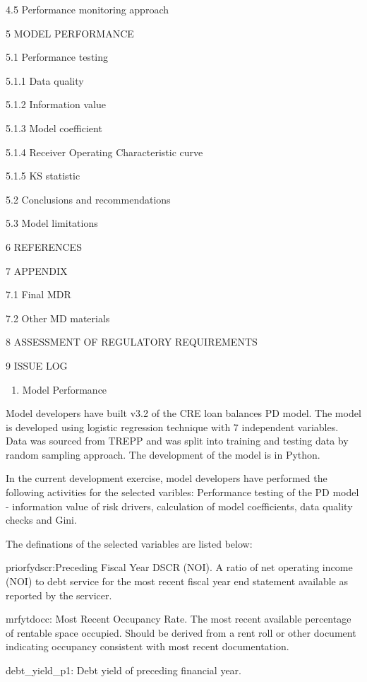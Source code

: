4.5 Performance monitoring approach

5 MODEL PERFORMANCE

5.1 Performance testing

5.1.1 Data quality

5.1.2 Information value

5.1.3 Model coefficient

5.1.4 Receiver Operating Characteristic curve

5.1.5 KS statistic

5.2 Conclusions and recommendations

5.3 Model limitations

6 REFERENCES

7 APPENDIX

7.1 Final MDR

7.2 Other MD materials

8 ASSESSMENT OF REGULATORY REQUIREMENTS

9 ISSUE LOG

\begin{enumerate}
\def\labelenumi{\arabic{enumi}.}
\setcounter{enumi}{4}
\tightlist
\item
  Model Performance
\end{enumerate}

Model developers have built v3.2 of the CRE loan balances PD model. The
model is developed using logistic regression technique with 7
independent variables. Data was sourced from TREPP and was split into
training and testing data by random sampling approach. The development
of the model is in Python.

In the current development exercise, model developers have performed the
following activities for the selected varibles: Performance testing of
the PD model - information value of risk drivers, calculation of model
coefficients, data quality checks and Gini.

The definations of the selected variables are listed below:

priorfydscr:Preceding Fiscal Year DSCR (NOI). A ratio of net operating
income (NOI) to debt service for the most recent fiscal year end
statement available as reported by the servicer.

mrfytdocc: Most Recent Occupancy Rate. The most recent available
percentage of rentable space occupied. Should be derived from a rent
roll or other document indicating occupancy consistent with most recent
documentation.

debt\_yield\_p1: Debt yield of preceding financial year.

